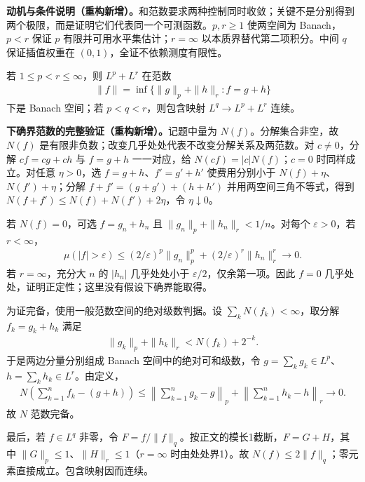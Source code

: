 \documentclass[../../main.tex]{subfiles}
\begin{document}
\begin{remark}
\textbf{动机与条件说明（重构新增）。}和范数要求两种控制同时收敛；关键不是分别得到两个极限，而是证明它们代表同一个可测函数。$p,r\geqslant1$ 使两空间为 Banach，$p<r$ 保证 $p$ 有限并可用水平集估计；$r=\infty$ 以本质界替代第二项积分。中间 $q$ 保证插值权重在 $(0,1)$，全证不依赖测度有限性。
\end{remark}
\begin{exercise}\label{exercise:ch06-lp-sum-banach}
若 $1\leqslant p<r\leqslant\infty$，则 $L^p+L^r$ 在范数
\begin{align*}
\|f\|=\inf\{\|g\|_p+\|h\|_r:f=g+h\}
\end{align*}
下是 Banach 空间；若 $p<q<r$，则包含映射 $L^q\to L^p+L^r$ 连续。
\end{exercise}
\begin{solution}
\textbf{下确界范数的完整验证（重构新增）。}记题中量为 $N(f)$。分解集合非空，故 $N(f)$ 是有限非负数；改变几乎处处代表不改变分解关系及两范数。对 $c\ne0$，分解 $cf=cg+ch$ 与 $f=g+h$ 一一对应，给 $N(cf)=|c|N(f)$；$c=0$ 时同样成立。对任意 $\eta>0$，选 $f=g+h$、$f'=g'+h'$ 使费用分别小于 $N(f)+\eta$、$N(f')+\eta$；分解 $f+f'=(g+g')+(h+h')$ 并用两空间三角不等式，得到 $N(f+f')\leqslant N(f)+N(f')+2\eta$，令 $\eta\downarrow0$。

若 $N(f)=0$，可选 $f=g_n+h_n$ 且 $\|g_n\|_p+\|h_n\|_r<1/n$。对每个 $\varepsilon>0$，若 $r<\infty$，
\begin{align*}
\mu(|f|>\varepsilon)\leqslant(2/\varepsilon)^p\|g_n\|_p^p
 +(2/\varepsilon)^r\|h_n\|_r^r\longrightarrow0.
\end{align*}
若 $r=\infty$，充分大 $n$ 的 $|h_n|$ 几乎处处小于 $\varepsilon/2$，仅余第一项。因此 $f=0$ 几乎处处，证明正定性；这里没有假设下确界能取得。

为证完备，使用一般范数空间的绝对级数判据。设 $\sum_kN(f_k)<\infty$，取分解 $f_k=g_k+h_k$ 满足
\begin{align*}
\|g_k\|_p+\|h_k\|_r<N(f_k)+2^{-k}.
\end{align*}
于是两边分量分别组成 Banach 空间中的绝对可和级数，令 $g=\sum_kg_k\in L^p$、$h=\sum_kh_k\in L^r$。由定义，
\begin{align*}
N\left(\sum_{k=1}^nf_k-(g+h)\right)
\leqslant\left\|\sum_{k=1}^ng_k-g\right\|_p+
       \left\|\sum_{k=1}^nh_k-h\right\|_r\longrightarrow0.
\end{align*}
故 $N$ 范数完备。

最后，若 $f\in L^q$ 非零，令 $F=f/\|f\|_q$。按正文的模长1截断，$F=G+H$，其中 $\|G\|_p\leqslant1$、$\|H\|_r\leqslant1$（$r=\infty$ 时由处处界1）。故 $N(f)\leqslant2\|f\|_q$；零元素直接成立。包含映射因而连续。
\end{solution}
\end{document}
